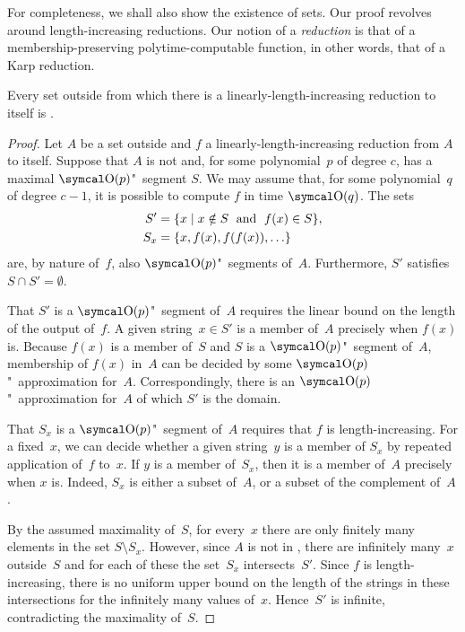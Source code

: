 For completeness, we shall also show the existence of  sets.
Our proof revolves around length-increasing reductions.
Our notion of a \emph{reduction} is that of a membership-preserving polytime-computable function, in other words, that of a Karp reduction.
\begin{theorem}
\label{thm:fpt-levelable}%
  Every set outside  from which there is a linearly-length-increasing reduction to itself is .
\end{theorem}
\begin{proof}
  Let $A$ be a set outside  and $f$ a linearly-length-increasing reduction from $A$ to itself.
  Suppose that $A$ is not  and, for some polynomial~$p$ of degree $c$, has a maximal $\bigO(p)$"~segment $S$.
  We may assume that, for some polynomial~$q$ of degree $c - 1$, it is possible to compute $f$ in time $\bigO(q)$.
  The sets
  \begin{align*}
    S' &= \{x \;|\; x \notin S \;\text{ and }\; f(x) \in S\}, \\
    S_x &= \{x, f(x), f(f(x)), \ldots\}
  \end{align*}
  are, by nature of~$f$, also $\bigO(p)$"~segments of~$A$.
  Furthermore, $S'$ satisfies $S \cap S' = \emptyset$.

  That $S'$ is a $\bigO(p)$"~segment of~$A$ requires the linear bound on the length of the output of~$f$.
  A given string~$x \in S'$ is a member of~$A$ precisely when $f(x)$ is.
  Because $f(x)$ is a member of~$S$ and $S$ is a $\bigO(p)$"~segment of~$A$, membership of $f(x)$ in~$A$ can be decided by some $\bigO(p)$"~approximation for~$A$.
  Correspondingly, there is an $\bigO(p)$"~approximation for~$A$ of which $S'$ is the domain.

  That $S_x$ is a $\bigO(p)$"~segment of~$A$ requires that $f$ is length-increasing.
  For a fixed~$x$, we can decide whether a given string~$y$ is a member of $S_x$ by repeated application of~$f$ to~$x$.
  If $y$ is a member of~$S_x$, then it is a member of~$A$ precisely when $x$ is.
  Indeed, $S_x$ is either a subset of~$A$, or a subset of the complement of~$A$.

  By the assumed maximality of~$S$, for every~$x$ there are only finitely many elements in the set $S \setminus S_x$.
  However, since $A$ is not in , there are infinitely many~$x$ outside~$S$ and for each of these the set~$S_x$ intersects~$S'$.
  Since $f$ is length-increasing, there is no uniform upper bound on the length of the strings in these intersections for the infinitely many values of~$x$.
  Hence~$S'$ is infinite, contradicting the maximality of~$S$.
\end{proof}

